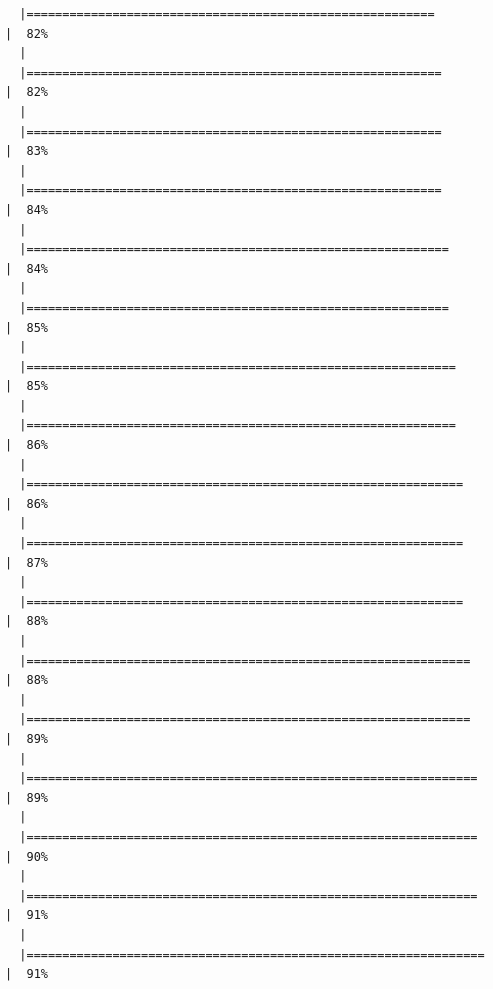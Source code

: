 \documentclass[
  letterpaper,
  DIV=11,
  numbers=noendperiod]{scrreprt}
\begin{document}
\begin{verbatim}
  |=========================================================             |  82%
  |                                                                            
  |==========================================================            |  82%
  |                                                                            
  |==========================================================            |  83%
  |                                                                            
  |==========================================================            |  84%
  |                                                                            
  |===========================================================           |  84%
  |                                                                            
  |===========================================================           |  85%
  |                                                                            
  |============================================================          |  85%
  |                                                                            
  |============================================================          |  86%
  |                                                                            
  |=============================================================         |  86%
  |                                                                            
  |=============================================================         |  87%
  |                                                                            
  |=============================================================         |  88%
  |                                                                            
  |==============================================================        |  88%
  |                                                                            
  |==============================================================        |  89%
  |                                                                            
  |===============================================================       |  89%
  |                                                                            
  |===============================================================       |  90%
  |                                                                            
  |===============================================================       |  91%
  |                                                                            
  |================================================================      |  91%

\end{verbatim}
\end{document}
